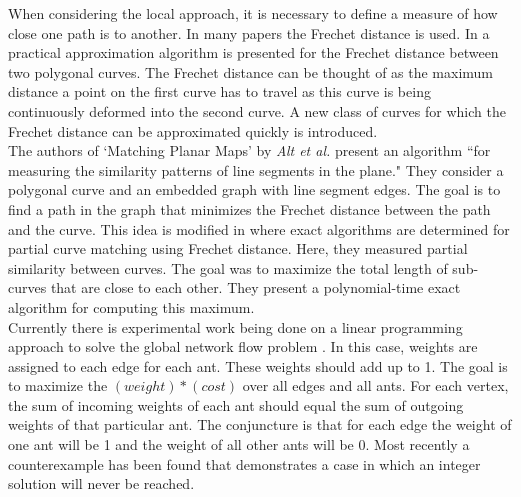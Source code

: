 \documentclass[12pt]{article}
\begin{document}
\indent When considering the local approach, it is necessary to define a measure of how close one path is to another. In many papers the Frechet distance is used. In \cite{Driemel10} a practical approximation algorithm is presented for the Frechet distance between two polygonal curves. The Frechet distance can be thought of as the maximum distance a point on the first curve has to travel as this curve is being continuously deformed into the second curve. A new class of curves for which the Frechet distance can be approximated quickly is introduced.\\
\indent The authors of `Matching Planar Maps' by {\it Alt et al.} \cite{Alt03} present an algorithm ``for measuring the similarity patterns of line segments in the plane." They consider a polygonal curve and an embedded graph with line segment edges. The goal is to find a path in the graph that minimizes the Frechet distance between the path and the curve. This idea is modified in \cite{Buchin09} where exact algorithms are determined for partial curve matching using Frechet distance. Here, they measured partial similarity between curves. The goal was to maximize the total length of sub-curves that are close to each other. They present a polynomial-time exact algorithm for computing this maximum.\\
\indent Currently there is experimental work being done on a linear programming approach to solve the global network flow problem \cite{Cruz13}. In this case, weights are assigned to each edge for each ant. These weights should add up to 1. The goal is to maximize the $(weight)*(cost)$ over all edges and all ants.  For each vertex, the sum of incoming weights of each ant should equal the sum of outgoing weights of that particular ant. The conjuncture is that for each edge the weight of one ant will be 1 and the weight of all other ants will be 0. Most recently a counterexample has been found that demonstrates a case in which an integer solution will never be reached. 
\end{document}
